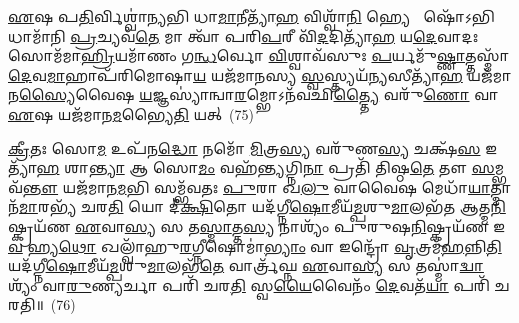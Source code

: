 \-\ul{𑌏}\-𑌷 𑌪\-\ul{𑌤𑌿}\-𑌰𑍍𑌵𑌿𑌶𑍍𑌵𑌾॑\-\ul{𑌨𑍍𑌯}\-𑌭𑌿 𑌧𑌾\-\ul{𑌮𑌾}\-𑌨𑍀𑌤𑍍𑌯𑌾᳴\-\ul{𑌹} 𑌵𑌿𑌶𑍍𑌵𑌾᳴\-\ul{𑌨𑌿} 𑌹𑍍𑌯𑍇  𑌷𑍋᳴\-𑌽𑌭𑌿 𑌧𑌾𑌮𑌾᳴𑌨𑌿 \ul{𑌪𑍍𑌰}\-𑌚𑍍𑌯𑌵᳴\-\ul{𑌤𑍇} 𑌮𑌾 𑌤𑍍𑌵𑌾᳴ 𑌪𑌰𑌿\-\ul{𑌪}\-𑌰𑍀 𑌵𑌿᳴\-\ul{𑌦}\-𑌦𑌿𑌤𑍍𑌯𑌾᳴\-\ul{𑌹} 𑌯\-\ul{𑌦𑍇}\-𑌵𑌾𑌦𑌃 𑌸𑍋𑌮᳴𑌮𑌾\-\ul{𑌹𑍍𑌰𑌿}\-𑌯𑌮𑌾᳴𑌣𑌂 𑌗\-\ul{𑌨𑍍𑌧}\-𑌰𑍍𑌵𑍋 \ul{𑌵𑌿}\-𑌶𑍍𑌵𑌾𑌵᳴𑌸𑍁𑌃 \ul{𑌪}\-𑌰𑍍𑌯𑌮𑍁᳴\-\ul{𑌷𑍍𑌣𑌾}\-𑌤𑍍𑌤𑌸𑍍𑌮𑌾᳴\-\ul{𑌦𑍇}\-𑌵\-\ul{𑌮𑌾}\-𑌹𑌾𑌪᳴𑌰𑌿𑌮𑍋𑌷𑌾\-\ul{𑌯} 𑌯𑌜᳴𑌮𑌾𑌨𑌸𑍍𑌯 \ul{𑌸𑍍𑌵}\-𑌸𑍍𑌤𑍍𑌯𑌯᳴\-\ul{𑌨𑍍𑌯}\-𑌸𑍀𑌤𑍍𑌯𑌾᳴\-\ul{𑌹} 𑌯𑌜᳴𑌮𑌾𑌨\-\ul{𑌸𑍍𑌯𑍈}\-𑌵𑍈𑌷 \ul{𑌯}\-𑌜𑍍𑌞𑌸𑍍𑌯𑌾॑𑌨𑍍𑌵𑌾\-\ul{𑌰}\-𑌮𑍍𑌭𑍋\-𑌽𑌨᳴𑌵𑌛𑌿\-\ul{𑌤𑍍𑌤𑍍𑌯𑍈} 𑌵𑌰𑍁᳴\-\ul{𑌣𑍋} 𑌵𑌾 \ul{𑌏}\-𑌷 𑌯𑌜᳴𑌮𑌾𑌨\-\ul{𑌮}\-𑌭𑍍𑌯𑍈\-\ul{𑌤𑌿} 𑌯𑌤𑍍~(75)

\-\ul{𑌕𑍍𑌰𑍀}\-𑌤𑌃 𑌸𑍋\-\ul{𑌮} 𑌉𑌪᳴𑌨\-\ul{𑌦𑍍𑌧𑍋} 𑌨𑌮𑍋᳴ \ul{𑌮𑌿}\-𑌤𑍍𑌰\-\ul{𑌸𑍍𑌯} 𑌵𑌰𑍁᳴𑌣\-\ul{𑌸𑍍𑌯} 𑌚𑌕𑍍𑌷᳴\-\ul{𑌸} 𑌇𑌤𑍍𑌯𑌾᳴\-\ul{𑌹} 𑌶𑌾\-\ul{𑌨𑍍𑌤𑍍𑌯𑌾} 𑌆 𑌸𑍋\-\ul{𑌮𑌂} 𑌵𑌹᳴\-\ul{𑌨𑍍𑌤𑍍𑌯}\-𑌗𑍍𑌨𑌿\-\ul{𑌨𑌾} 𑌪𑍍𑌰𑌤𑌿᳴ 𑌤𑌿𑌷𑍍𑌠\-\ul{𑌤𑍇} 𑌤𑍗 \ul{𑌸}\-𑌮𑍍𑌭𑌵᳴\-\ul{𑌨𑍍𑌤𑍗} 𑌯𑌜᳴𑌮𑌾𑌨\-\ul{𑌮}\-𑌭𑌿 𑌸𑌮𑍍𑌭᳴𑌵𑌤𑌃 \ul{𑌪𑍁}\-𑌰𑌾 𑌖\-\ul{𑌲𑍁} 𑌵𑌾𑌵𑍈𑌷 𑌮𑍇𑌧𑌾᳴\-\ul{𑌯𑌾}\-𑌤𑍍𑌮𑌾𑌨᳴\-\ul{𑌮𑌾}\-𑌰𑌭𑍍𑌯᳴ 𑌚𑌰\-\ul{𑌤𑌿} 𑌯𑍋 𑌦𑍀॑\-\ul{𑌕𑍍𑌷𑌿}\-𑌤𑍋 𑌯𑌦᳴𑌗𑍍𑌨𑍀\-\ul{𑌷𑍋}\-𑌮𑍀𑌯᳴\-\ul{𑌮𑍍𑌪}\-𑌶𑍁\-\ul{𑌮𑌾}\-𑌲𑌭᳴𑌤 𑌆𑌤𑍍𑌮\-\ul{𑌨𑌿}\-𑌷𑍍𑌕𑍍𑌰𑌯᳴𑌣 \ul{𑌏}\-𑌵𑌾\-\ul{𑌸𑍍𑌯} 𑌸 𑌤\-\ul{𑌸𑍍𑌮𑌾}\-𑌤𑍍𑌤\-\ul{𑌸𑍍𑌯} 𑌨𑌾𑌶𑍍𑌯𑌂᳴ 𑌪𑍁𑌰𑍁𑌷\-\ul{𑌨𑌿}\-𑌷𑍍𑌕𑍍𑌰𑌯᳴𑌣 𑌇\-\ul{𑌵} 𑌹𑍍𑌯\-\ul{𑌥𑍋} 𑌖𑌲𑍍𑌵𑌾᳴𑌹𑍁\-\ul{𑌰}\-𑌗𑍍𑌨𑍀𑌷𑍋𑌮𑌾॑\-\ul{𑌭𑍍𑌯𑌾𑌂} 𑌵𑌾 𑌇𑌨𑍍𑌦𑍍𑌰𑍋᳴ \ul{𑌵𑍃}\-𑌤𑍍𑌰𑌮᳴\-\ul{𑌹}\-𑌨𑍍𑌨𑌿\-\ul{𑌤𑌿} 𑌯𑌦᳴𑌗𑍍𑌨𑍀\-\ul{𑌷𑍋}\-𑌮𑍀𑌯᳴\-\ul{𑌮𑍍𑌪}\-𑌶𑍁\-\ul{𑌮𑌾}\-𑌲𑌭᳴\-\ul{𑌤𑍇} 𑌵𑌾𑌰𑍍𑌤𑍍𑌰᳴𑌘𑍍𑌨 \ul{𑌏}\-𑌵𑌾\-\ul{𑌸𑍍𑌯} 𑌸 𑌤𑌸𑍍𑌮𑌾॑\-\ul{𑌦𑍍𑌵𑌾}\-𑌶𑍍𑌯𑌂᳴ 𑌵𑌾\-\ul{𑌰𑍁}\-𑌣𑍍𑌯𑌰𑍍𑌚𑌾 𑌪𑌰𑌿᳴ 𑌚𑌰\-\ul{𑌤𑌿} 𑌸𑍍𑌵\-\ul{𑌯𑍈}\-𑌵𑍈𑌨𑌂᳴ \ul{𑌦𑍇}\-𑌵𑌤᳴\-\ul{𑌯𑌾} 𑌪𑌰𑌿᳴ 𑌚𑌰𑌤𑌿॥~(76)

{\anuvakamend[{\-\ul{𑌅}\-\-\ul{𑌨𑍍𑌵𑌾}\-𑌰𑌭𑍍𑌯𑍋𑌥𑍍𑌸𑌰𑍍𑌵𑌾᳴𑌭𑌿\-\ul{𑌰𑍇}\-𑌵 𑌸𑍂𑌰𑍍𑌯𑌂᳴ \ul{𑌭𑍂}\-𑌤𑌾\-\ul{𑌨𑌾}\-\-\ul{𑍞} 𑌹𑍍𑌯𑍇᳴\-\ul{𑌤𑌿} 𑌯𑌦𑌾᳴𑌹𑍁𑌃 \ul{𑌸}\-𑌪𑍍𑌤𑌵𑌿𑍞᳴𑌶𑌤𑌿𑌶𑍍𑌚}]}%


{\anuvakamend[{𑌯\-\ul{𑌦𑍁}\-𑌭𑍗 𑌦𑍇᳴𑌵𑌾\-\ul{𑌸𑍁}\-𑌰𑌾 \ul{𑌮𑌿}\-𑌥𑌸𑍍𑌤𑍇𑌷𑌾𑍞᳴ 𑌸𑍁\-\ul{𑌵}\-𑌰𑍍𑌗𑌂 𑌯𑌦𑍍𑌵𑌾 𑌅𑌨𑍀᳴𑌶𑌾𑌨𑌃 \ul{𑌪𑍁}\-𑌰𑍋𑌹᳴𑌵𑌿\-\ul{𑌷𑌿} 𑌤𑍇\-\ul{𑌭𑍍𑌯𑌃} 𑌸𑍋𑌤𑍍𑌤᳴𑌰\-\ul{𑌵𑍇}\-𑌦𑌿\-\ul{𑌰𑍍𑌬}\-𑌦𑍍𑌧𑌂 \ul{𑌦𑍇}\-𑌵𑌸𑍍𑌯𑌾\-\ul{𑌭𑍍𑌰𑌿}\-\-\ul{𑍞} 𑌶𑌿\-\ul{𑌰𑍋} 𑌵𑌾 𑌏𑌕𑌾᳴\-𑌦𑌶}]}%
